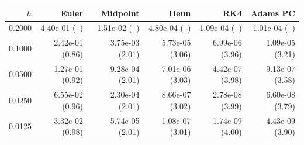 \begin{tabular}{r rrrrr}
\hline
$h$ & Euler & Midpoint & Heun & RK4 & Adams PC \\
\hline
0.2000 & 4.40e-01 (--) & 1.51e-02 (--) & 4.80e-04 (--) & 1.09e-04 (--) & 1.01e-04 (--) \\
0.1000 & 2.42e-01 (0.86) & 3.75e-03 (2.01) & 5.73e-05 (3.06) & 6.99e-06 (3.96) & 1.09e-05 (3.21) \\
0.0500 & 1.27e-01 (0.92) & 9.28e-04 (2.01) & 7.01e-06 (3.03) & 4.42e-07 (3.98) & 9.13e-07 (3.58) \\
0.0250 & 6.55e-02 (0.96) & 2.30e-04 (2.01) & 8.66e-07 (3.02) & 2.78e-08 (3.99) & 6.60e-08 (3.79) \\
0.0125 & 3.32e-02 (0.98) & 5.74e-05 (2.01) & 1.08e-07 (3.01) & 1.74e-09 (4.00) & 4.43e-09 (3.90) \\
\hline
\end{tabular}
